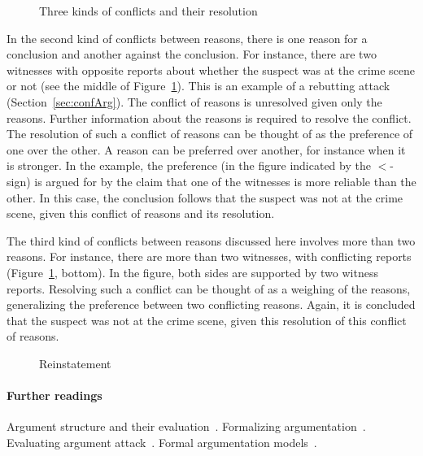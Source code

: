 \documentclass[10pt]{article}
\begin{document}
\begin{figure}[bt]
\centering

\caption{Three kinds of conflicts and their resolution\label{fig:conflicts}}
\end{figure}

In the second kind of conflicts between reasons, there is one reason for a conclusion and another against the conclusion. For instance, there are two witnesses with opposite reports about whether the suspect was at the crime scene or not (see the middle of Figure~\ref{fig:conflicts}). This is an example of a rebutting attack (Section~\ref{sec:confArg}). The conflict of reasons is unresolved given only the reasons. Further information about the reasons is required to resolve the conflict. The resolution of such a conflict of reasons can be thought of as the preference of one over the other. A reason can be preferred over another, for instance when it is stronger. In the example, the preference (in the figure indicated by the $<$-sign) is argued for by the claim that one of the witnesses is more reliable than the other. In this case, the conclusion follows that the suspect was not at the crime scene, given this conflict of reasons and its resolution. 

The third kind of conflicts between reasons discussed here involves more than two reasons. For instance, there are more than two witnesses, with conflicting reports (Figure~\ref{fig:conflicts}, bottom). In the figure, both sides are supported by two witness reports. Resolving such a conflict can be thought of as a weighing of the reasons, generalizing the preference between two conflicting reasons. Again, it is concluded that the suspect was not at the crime scene, given this resolution of this conflict of reasons.





\begin{figure}[bt]
\centering

\caption{Reinstatement\label{fig:reinstatement}}
\end{figure}


\paragraph{Further readings}
Argument structure and their evaluation~\citep{pollock1995}. Formalizing argumentation~\citep{prakkenVreeswijk2002}. Evaluating argument attack~\citep{dung1995}. 
Formal argumentation models~\citep{simariLoui1992, vreeswijk1997, prakken2010, verheij2003deflog, gordonEtal2007}. 
\end{document}
